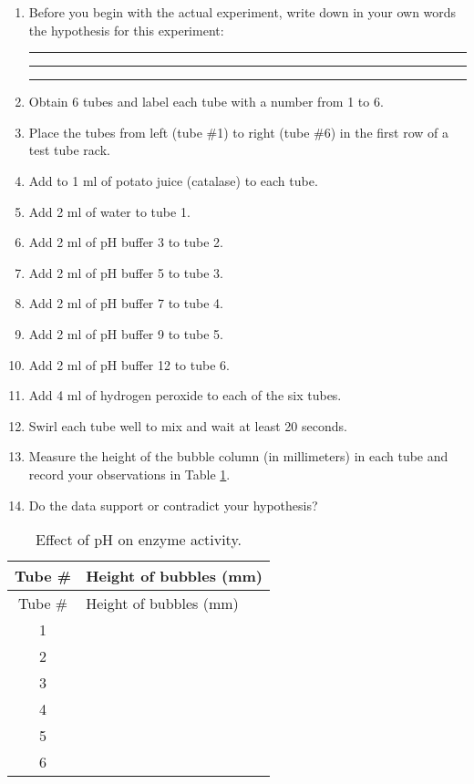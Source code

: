 \begin{enumerate}
\def\labelenumi{\arabic{enumi}.}
\item
  Before you begin with the actual experiment, write down in your own
  words the hypothesis for this experiment:

  \begin{center}\rule{0.5\linewidth}{\linethickness}\end{center}

  \begin{center}\rule{0.5\linewidth}{\linethickness}\end{center}

  \begin{center}\rule{0.5\linewidth}{\linethickness}\end{center}
\item
  Obtain 6 tubes and label each tube with a number from 1 to 6.
\item
  Place the tubes from left (tube \#1) to right (tube \#6) in the first
  row of a test tube rack.
\item
  Add to 1 ml of potato juice (catalase) to each tube.
\item
  Add 2 ml of water to tube 1.
\item
  Add 2 ml of pH buffer 3 to tube 2.
\item
  Add 2 ml of pH buffer 5 to tube 3.
\item
  Add 2 ml of pH buffer 7 to tube 4.
\item
  Add 2 ml of pH buffer 9 to tube 5.
\item
  Add 2 ml of pH buffer 12 to tube 6.
\item
  Add 4 ml of hydrogen peroxide to each of the six tubes.
\item
  Swirl each tube well to mix and wait at least 20 seconds.
\item
  Measure the height of the bubble column (in millimeters) in each tube
  and record your observations in Table \ref{tab:pH}.
\item
  Do the data support or contradict your hypothesis?
\end{enumerate}

\begin{longtable}[]{@{}cl@{}}
\caption{\label{tab:pH} Effect of pH on enzyme activity.}\tabularnewline
\toprule
Tube \# & Height of bubbles (mm)\tabularnewline
\midrule
\endfirsthead
\toprule
Tube \# & Height of bubbles (mm)\tabularnewline
\midrule
\endhead
1 &\tabularnewline
2 &\tabularnewline
3 &\tabularnewline
4 &\tabularnewline
5 &\tabularnewline
6 &\tabularnewline
\bottomrule
\end{longtable}


